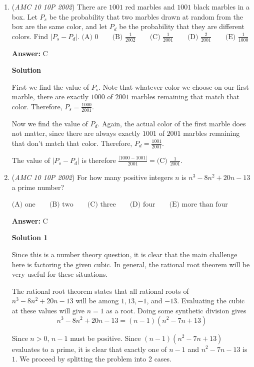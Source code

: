 \begin{enumerate}
	\item (\textit{AMC 10 10P 2002}) There are $1001$ red marbles and $1001$ black marbles in a box. Let $P_s$ be the probability that two marbles drawn at random from the box are the same color, and let $P_d$ be the probability that they are different colors. Find $|P_s-P_d|.$
$\text{(A) }0 \qquad \text{(B) }\frac{1}{2002} \qquad \text{(C) }\frac{1}{2001} \qquad \text{(D) }\frac {2}{2001} \qquad \text{(E) }\frac{1}{1000}$

 \textbf{Answer: }C



\textbf{Solution}

First we find the value of $P_s$. Note that whatever color we choose on our first marble, there are exactly $1000$ of $2001$ marbles remaining that match that color. Therefore, $P_s = \frac {1000}{2001}$.

 Now we find the value of $P_d$. Again, the actual color of the first marble does not matter, since there are always exactly $1001$ of $2001$ marbles remaining that don't match that color. Therefore, $P_d = \frac{1001}{2001}$.

 The value of $|P_s - P_d|$ is therefore $\frac {|1000-1001|}{2001} = \boxed {\text{(C) }\frac{1}{2001}}$.

 


	\item (\textit{AMC 10 10P 2002}) For how many positive integers $n$ is $n^3 - 8n^2 + 20n - 13$ a prime number?


 $\text{(A) one} \qquad \text{(B) two} \qquad \text{(C) three} \qquad \text{(D) four} \qquad \text{(E) more than four}$

 \textbf{Answer: }C



\textbf{Solution 1}

Since this is a number theory question, it is clear that the main challenge here is factoring the given cubic. In general, the rational root theorem will be very useful for these situations. 

 The rational root theorem states that all rational roots of $n^3 - 8n^2 + 20n - 13$ will be among $1, 13, -1$, and $-13$. Evaluating the cubic at these values will give $n = 1$ as a root. Doing some synthetic division gives 
 \[n^3 - 8n^2 + 20n - 13 = (n-1)(n^2 - 7n + 13)\]

 Since $n > 0$, $n-1$ must be positive. Since $(n-1)(n^2 - 7n + 13)$ evaluates to a prime, it is clear that exactly one of $n-1$ and $n^2 - 7n - 13$ is $1$. We proceed by splitting the problem into 2 cases.


\end{enumerate}
